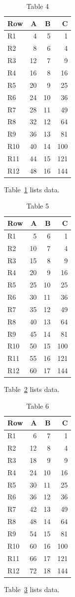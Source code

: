 \documentclass[10pt]{article}
\begin{document}
\begin{table}[ht]\centering\caption{Table 4}\label{tab:4}\begin{tabular}{lrrr}\toprule Row&A&B&C\\\midrule
R1&4&5&1\\
R2&8&6&4\\
R3&12&7&9\\
R4&16&8&16\\
R5&20&9&25\\
R6&24&10&36\\
R7&28&11&49\\
R8&32&12&64\\
R9&36&13&81\\
R10&40&14&100\\
R11&44&15&121\\
R12&48&16&144\\
\bottomrule\end{tabular}\end{table} Table~\ref{tab:4} lists data.
\begin{table}[ht]\centering\caption{Table 5}\label{tab:5}\begin{tabular}{lrrr}\toprule Row&A&B&C\\\midrule
R1&5&6&1\\
R2&10&7&4\\
R3&15&8&9\\
R4&20&9&16\\
R5&25&10&25\\
R6&30&11&36\\
R7&35&12&49\\
R8&40&13&64\\
R9&45&14&81\\
R10&50&15&100\\
R11&55&16&121\\
R12&60&17&144\\
\bottomrule\end{tabular}\end{table} Table~\ref{tab:5} lists data.
\begin{table}[ht]\centering\caption{Table 6}\label{tab:6}\begin{tabular}{lrrr}\toprule Row&A&B&C\\\midrule
R1&6&7&1\\
R2&12&8&4\\
R3&18&9&9\\
R4&24&10&16\\
R5&30&11&25\\
R6&36&12&36\\
R7&42&13&49\\
R8&48&14&64\\
R9&54&15&81\\
R10&60&16&100\\
R11&66&17&121\\
R12&72&18&144\\
\bottomrule\end{tabular}\end{table}\clearpage Table~\ref{tab:6} lists data.
\end{document}
